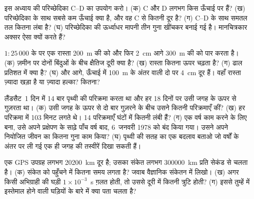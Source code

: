 \begin{exercise}[$\star\star$]\label{exo:g9:maps-of-the-earth:7}
इस अध्याय की परिच्छेदिका C--D का उपयोग करो। (क) C और D लगभग किस ऊँचाई पर हैं?
(ख) परिच्छेदिका के साथ सबसे कम ऊँचाई क्या है, और वह C से कितनी दूर है? (ग) C--D के साथ
समतल  तल कितना लंबा है? (घ) परिच्छेदिका की ऊर्ध्वाधर मापनी तीन गुना खींचकर बनाई गई है।
मानचित्रकार अक्सर ऐसा क्यों करते
हैं?
\end{exercise}

\begin{exercise}[$\star\star$]\label{exo:g9:maps-of-the-earth:8}
$1 : 25\,000$ के  पर एक रास्ता \qty{200}{m} की  को और फिर
\qty{2}{cm} आगे \qty{300}{m} की  को पार करता है। (क) ज़मीन पर दोनों
बिंदुओं के बीच क्षैतिज दूरी क्या है? (ख) रास्ता कितना ऊपर चढ़ता है? (ग) ढाल प्रतिशत में क्या
है? (घ) और आगे, ऊँचाई में \qty{100}{m} के अंतर वाली दो   पर
\qty{4}{cm} दूर हैं। वहाँ रास्ता ज़्यादा खड़ा है या ज़्यादा हल्का? कितना?
\end{exercise}

\begin{exercise}[$\star\star$]\label{exo:g9:maps-of-the-earth:9}
लैंडसैट~1 दिन में 14 बार पृथ्वी की परिक्रमा करता था और हर 18 दिनों पर उसी जगह के ऊपर से
गुज़रता था। (क) उसी जगह के ऊपर से दो बार गुज़रने के बीच उसने कितनी परिक्रमाएँ कीं? (ख) हर
परिक्रमा में 103 मिनट लगते थे। 14 परिक्रमाएँ घंटों में कितनी लंबी हैं? (ग) एक वर्ष काम
करने के लिए बना, उसे अपने प्रक्षेपण के साढ़े पाँच वर्ष बाद, 6~जनवरी 1978 को बंद किया गया।
उसने अपने नियोजित जीवन का कितना गुना काम किया? (घ) पृथ्वी की सतह का एक बदलाव बताओ जो
वर्षों के अंतर पर ली गई एक ही जगह की तस्वीरें दिखा सकती
हैं।
\end{exercise}

\begin{exercise}[$\star\star$]\label{exo:g9:maps-of-the-earth:10}
एक GPS उपग्रह लगभग \qty{20200}{km} दूर है; उसका संकेत लगभग \qty{300000}{km}
प्रति सेकंड से चलता है। (क) संकेत को पहुँचने में कितना समय लगता है? जवाब वैज्ञानिक संकेतन
में लिखो। (ख) अगर किसी अभिग्राही की घड़ी $1 \times 10^{-3}$~s ग़लत होती, तो उससे दूरी में
कितनी त्रुटि होती? (ग) इससे तुम्हें  में इस्तेमाल होने वाली घड़ियों के बारे
में क्या पता चलता
है?
\end{exercise}

